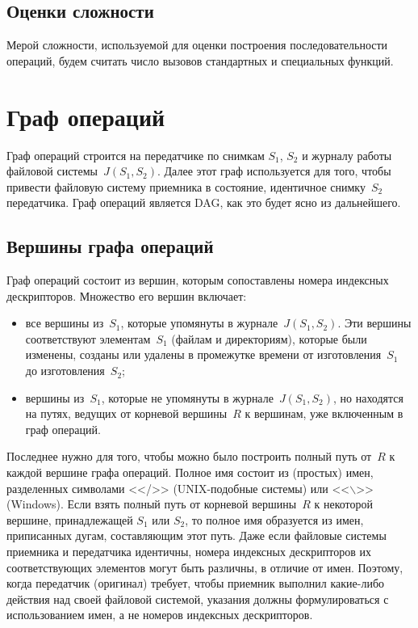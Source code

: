 \begin{multicols}{2}
\subsection{Оценки сложности }

      Мерой сложности, используемой для оценки построения 
последовательности операций, будем считать число вызовов стандартных и 
специальных функций.

\section{Граф операций}

      Граф операций строится на передатчике по снимкам $S_1$, $S_2$ и 
журналу работы файловой сис\-те\-мы~$J(S_1, S_2)$. Далее этот граф используется 
для того, чтобы привести файловую систему приемника в состояние, 
идентичное снимку~$S_2$ передатчика. Граф операций является DAG, как это 
будет ясно из дальнейшего.

\vspace*{-3pt}
\subsection{Вершины графа операций}
\vspace*{-1pt}

      Граф операций состоит из вершин, которым сопоставлены номера 
индексных дескрипторов. Множество его вершин включает:
      \begin{itemize}
\item все вершины из~$S_1$, которые упомянуты в журнале~$J(S_1, S_2)$. 
Эти вершины соответствуют элементам~$S_1$ (файлам и директориям), 
которые были изменены, созданы или удалены в промежутке времени от 
изготовления~$S_1$ до изготовления~$S_2$;\\[-15pt]
\item вершины из~$S_1$, которые не упомянуты в журнале~$J(S_1, S_2)$, но 
находятся на путях, ведущих от корневой вершины~$R$ к вершинам, уже 
включенным в граф операций. 
\end{itemize}

      Последнее нужно для того, чтобы можно было построить полный путь 
от~$R$ к каждой вершине графа операций. Полное имя  состоит из (прос\-тых) 
имен, разделенных символами <</>> (UNIX-по\-доб\-ные системы)  или 
<<$\backslash$>> (Windows).  Если взять полный путь от корневой 
вершины~$R$ к некоторой вершине, принадлежащей $S_1$ или $S_2$, то полное 
имя образуется из имен, приписанных дугам, составляющим этот путь.  Даже 
если файловые системы приемника и передатчика идентичны, номера 
индексных де\-скрип\-то\-ров их соответствующих элементов могут быть различны, 
в отличие от имен. Поэтому, когда передатчик (оригинал) требует, чтобы 
приемник выполнил какие-либо действия над своей файловой системой, 
указания должны формулироваться с использованием имен, а не номеров 
индексных де\-скрип\-то\-ров. 


\end{multicols}
